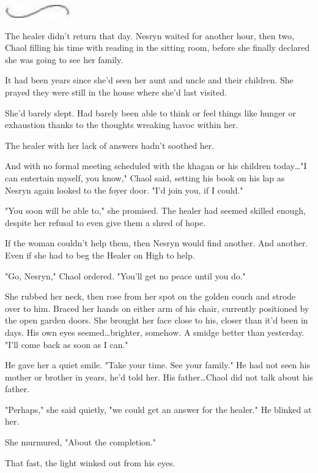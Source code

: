\begin{Center}
\includegraphics[width=1.12in,height=0.24in]{images/seperator}
\end{Center}

The healer didn't return that day.
Nesryn waited for another hour, then two, Chaol filling his time with reading in the sitting room, before she finally declared she was going to see her family.

It had been years since she'd seen her aunt and uncle and their children.
She prayed they were still in the house where she'd last visited.

She'd barely slept.
Had barely been able to think or feel things like hunger or exhaustion thanks to the thoughts wreaking havoc within her.

The healer with her lack of answers hadn't soothed her.

And with no formal meeting scheduled with the khagan or his children today\ldots "I can entertain myself, you know," Chaol said, setting his book on his lap as Nesryn again looked to the foyer door.
"I'd join you, if I could."

"You soon will be able to," she promised.
The healer had seemed skilled enough, despite her refusal to even give them a shred of hope.

If the woman couldn't help them, then Nesryn would find another.
And another.
Even if she had to beg the Healer on High to help.

"Go, Nesryn," Chaol ordered.
"You'll get no peace until you do."

She rubbed her neck, then rose from her spot on the golden couch and strode over to him.
Braced her hands on either arm of his chair, currently positioned by the open garden doors.
She brought her face close to his, closer than it'd been in days.
His own eyes seemed\ldots brighter, somehow.
A smidge better than yesterday.
"I'll come back as soon as I can."

He gave her a quiet smile.
"Take your time.
See your family."
He had not seen his mother or brother in years, he'd told her.
His father\ldots Chaol did not talk about his father.

"Perhaps," she said quietly, "we could get an answer for the healer."
He blinked at her.

She murmured, "About the completion."

That fast, the light winked out from his eyes.

